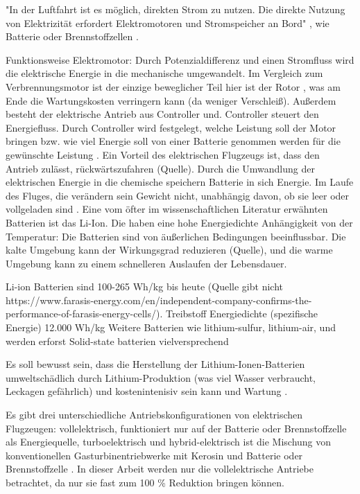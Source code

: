 "In der Luftfahrt ist es möglich, direkten Strom zu nutzen. Die direkte Nutzung von
Elektrizität erfordert Elektromotoren und Stromspeicher an Bord" \cite{dahal2021techno}, wie Batterie oder Brennstoffzellen \cite{dalmia2022powering}.

Funktionsweise Elektromotor: Durch Potenzialdifferenz und einen Stromfluss wird die elektrische Energie in die mechanische umgewandelt.
Im Vergleich zum Verbrennungsmotor ist der einzige beweglicher Teil hier ist der Rotor \cite{donckers2024electric}, 
was am Ende die Wartungskosten verringern kann (da weniger Verschleiß). Außerdem besteht der elektrische Antrieb aus Controller und.
Controller steuert den Energiefluss. Durch Controller wird festgelegt, welche Leistung soll der Motor bringen bzw. wie viel Energie soll von 
einer Batterie genommen werden für die gewünschte Leistung \cite{donckers2024electric}.
Ein Vorteil des elektrischen Flugzeugs ist, dass den Antrieb zulässt, rückwärtszufahren (Quelle). Durch die Umwandlung der elektrischen Energie in die chemische 
speichern Batterie in sich Energie. 
Im Laufe des Fluges, die verändern sein Gewicht nicht, unabhängig davon, ob sie leer oder vollgeladen sind \cite{donckers2024electric}. 
Eine vom öfter im wissenschaftlichen Literatur erwähnten Batterien ist das Li-Ion. Die haben eine hohe Energiedichte
Anhängigkeit von der Temperatur: Die Batterien sind von äußerlichen Bedingungen beeinflussbar. Die kalte Umgebung kann 
der Wirkungsgrad reduzieren (Quelle), und die warme Umgebung kann zu einem schnelleren Auslaufen der Lebensdauer.

Li-ion Batterien sind 100-265 Wh/kg bis heute (Quelle gibt nicht https://www.farasis-energy.com/en/independent-company-confirms-the-performance-of-farasis-energy-cells/). 
Treibstoff Energiedichte (spezifische Energie) 12.000 Wh/kg \cite{dalmia2022powering}
Weitere Batterien wie lithium-sulfur, lithium-air, und werden erforst Solid-state batterien vielversprechend


Es soll bewusst sein, dass die Herstellung der Lithium-Ionen-Batterien umweltschädlich durch Lithium-Produktion (was viel Wasser verbraucht, Leckagen gefährlich) und kostenintenisiv 
sein kann und Wartung \cite{dalmia2022powering}. 

Es gibt drei unterschiedliche Antriebskonfigurationen von elektrischen Flugzeugen: vollelektrisch, funktioniert nur auf der Batterie oder
 Brennstoffzelle als Energiequelle, turboelektrisch und hybrid-elektrisch ist die Mischung von konventionellen 
 Gasturbinentriebwerke mit Kerosin und Batterie oder Brennstoffzelle \cite{dahal2021techno}. In dieser Arbeit werden nur die vollelektrische
 Antriebe betrachtet, da nur sie fast zum 100 \% Reduktion bringen können.



